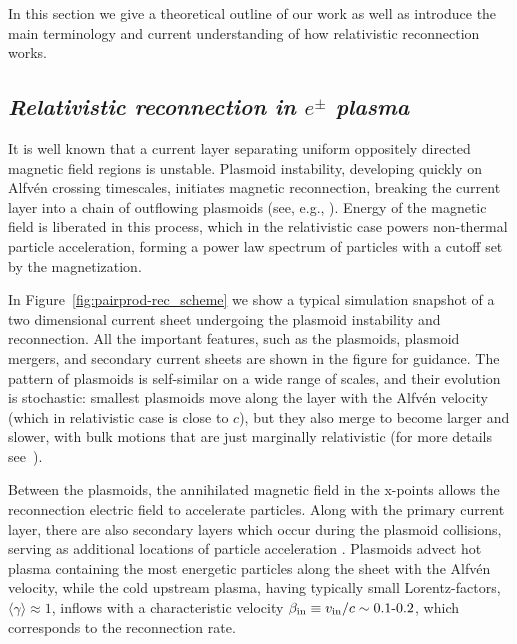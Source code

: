In this section we give a theoretical outline of our work as well as introduce the main terminology and current understanding of how relativistic reconnection works.

\subsection*{\small\it Relativistic reconnection in $e^\pm$ plasma}

It is well known that a current layer separating uniform oppositely directed magnetic field regions is unstable. Plasmoid instability, developing quickly on Alfv\'en crossing timescales, initiates  magnetic reconnection, breaking the current layer into a chain of outflowing plasmoids (see, e.g., \citealt{1997plasconf, 2007PhPl...14j0703L}). Energy of the magnetic field is liberated in this process, which in the relativistic case powers non-thermal particle acceleration, forming a power law spectrum of particles with a cutoff set by the magnetization.\par

In Figure~\ref{fig:pairprod-rec_scheme} we show a typical simulation snapshot of a two dimensional current sheet undergoing the plasmoid instability and reconnection. All the important features, such as the plasmoids, plasmoid mergers, and secondary current sheets are shown in the figure for guidance. The pattern of plasmoids is self-similar on a wide range of scales, and their evolution is stochastic: smallest plasmoids move along the layer with the Alfv\'en velocity (which in relativistic case is close to $c$), but they also merge to become larger and slower, with bulk motions that are just marginally relativistic (for more details see~\citealt{2016MNRAS.462...48S}).

Between the plasmoids, the annihilated magnetic field in the x-points allows the reconnection electric field to accelerate particles. Along with the primary current layer, there are also secondary layers which occur during the plasmoid collisions, serving as additional locations of particle acceleration \citep{2015ApJ...806..167G}. Plasmoids advect hot plasma containing the most energetic particles along the sheet with the Alfv\'en velocity, while the cold upstream plasma, having typically small Lorentz-factors, $\langle\gamma\rangle\approx 1$, inflows with a characteristic velocity $\beta_{\rm in}\equiv v_{\rm in}/c\sim0.1\text{-}0.2$, which corresponds to the reconnection rate. \par

